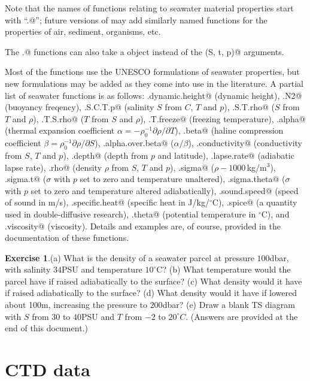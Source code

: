 \documentclass{article}
\newcommand{\workedexercise}[2]{
	\vspace{2ex plus 2ex minus 1ex}
	\begin{boxedminipage}[c]{0.95\linewidth}
		{\textbf{Exercise #1}.\hspace{1em}#2}
	\end{boxedminipage}
	\vspace{2ex plus 2ex minus 1ex}
}
\begin{document}
Note that the names of functions relating to seawater material properties start
with ``\verb@sw.@''; future versions of \verb@oce@ may add similarly named
functions for the properties of air, sediment, organisms, etc.

The \verb@sw.@ functions can also take a \verb@ctd@ object instead of the
\verb@(S, t, p)@ arguments.

Most of the functions use the UNESCO formulations of seawater properties, but new formulations
may be added as they come into use in the literature.
A partial list of seawater functions is as follows:
\verb@sw.dynamic.height@ (dynamic height),
\verb@sw.N2@ (buoyancy freqency),
\verb@sw.S.C.T.p@ (salinity $S$ from $C$, $T$ and $p$),
\verb@sw.S.T.rho@ ($S$ from $T$ and $\rho$),
\verb@sw.T.S.rho@ ($T$ from $S$ and $\rho$),
\verb@sw.T.freeze@ (freezing temperature),
\verb@sw.alpha@ (thermal expansion coefficient $\alpha=-\rho_0^{-1}\partial\rho/\partial T$),
\verb@sw.beta@ (haline compression coefficient $\beta=\rho_0^{-1}\partial\rho/\partial S$),
\verb@sw.alpha.over.beta@ ($\alpha/\beta$),
\verb@sw.conductivity@ (conductivity from $S$, $T$ and $p$),
\verb@sw.depth@ (depth from $p$ and latitude),
\verb@sw.lapse.rate@ (adiabatic lapse rate),
\verb@sw.rho@ (density $\rho$ from $S$, $T$ and $p$),
\verb@sw.sigma@ ($\rho-1000$\,kg/m$^3$),
\verb@sw.sigma.t@ ($\sigma$ with $p$ set to zero and temperature unaltered),
\verb@sw.sigma.theta@ ($\sigma$ with $p$ set to zero and temperature altered adiabatically),
\verb@sw.sound.speed@ (speed of sound in m/s),
\verb@sw.specific.heat@ (specific heat in J/kg/$^\circ$C),
\verb@sw.spice@ (a quantity used in double-diffusive research),
\verb@sw.theta@ (potential temperature in $^\circ$C),
and
\verb@sw.viscosity@ (viscosity).
Details and examples are, of course, provided in the documentation of these functions.


\workedexercise{1}{(a) What is the density of a seawater parcel at pressure
$100$dbar, with salinity $34$PSU and temperature $10^\circ$C?
(b) What temperature would the parcel have if raised adiabatically to the surface?
(c) What density would it have if raised adiabatically to the surface?
(d) What density would it have if lowered about 100m, increasing the pressure to $200$dbar?
(e) Draw a blank TS diagram with $S$ from $30$ to $40$PSU and $T$ from $-2$ to $20^\circ C$.  (Answers are provided at the end of this document.)
}


\section{CTD data}
\end{document}
